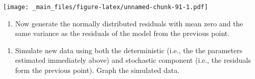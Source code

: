 \documentclass[
]{book}
\newenvironment{Shaded}{\begin{snugshade}}{\end{snugshade}}
\newcommand{\AttributeTok}[1]{\textcolor[rgb]{0.13,0.29,0.53}{#1}}
\newcommand{\CommentTok}[1]{\textcolor[rgb]{0.56,0.35,0.01}{\textit{#1}}}
\newcommand{\DecValTok}[1]{\textcolor[rgb]{0.00,0.00,0.81}{#1}}
\newcommand{\FunctionTok}[1]{\textcolor[rgb]{0.13,0.29,0.53}{\textbf{#1}}}
\newcommand{\NormalTok}[1]{#1}
\newcommand{\OtherTok}[1]{\textcolor[rgb]{0.56,0.35,0.01}{#1}}
\newcommand{\SpecialCharTok}[1]{\textcolor[rgb]{0.81,0.36,0.00}{\textbf{#1}}}
\providecommand{\tightlist}{%
  \setlength{\itemsep}{0pt}\setlength{\parskip}{0pt}}
\begin{document}
\texttt{[image: \_main\_files/figure-latex/unnamed-chunk-91-1.pdf]}

\begin{enumerate}
\def\labelenumi{\arabic{enumi}.}
\setcounter{enumi}{3}
\tightlist
\item
  Now generate the normally distributed residuals with mean zero and the same variance as the residuals of the model from the previous point.
\end{enumerate}

\begin{Shaded}
\end{Shaded}

\begin{enumerate}
\def\labelenumi{\arabic{enumi}.}
\setcounter{enumi}{4}
\tightlist
\item
  Simulate new data using both the deterministic (i.e., the the parameters estimated immediately above) and stochastic component (i.e., the residuals form the previous point). Graph the simulated data.
\end{enumerate}
\end{document}
